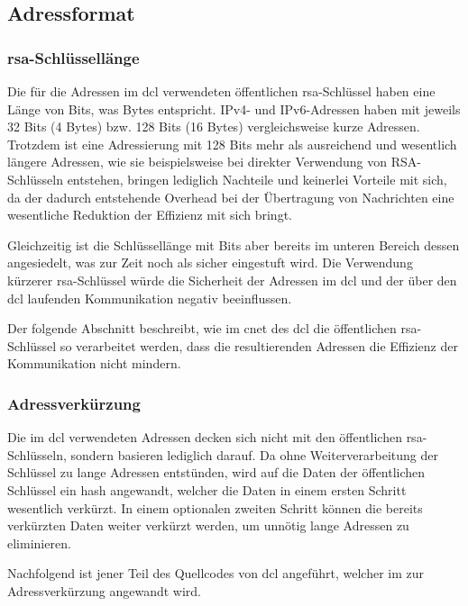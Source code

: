\subsection{Adressformat}

\subsubsection{\gls*{rsa}-Schlüssellänge}
Die für die Adressen im \gls{dcl} verwendeten öffentlichen \gls{rsa}-Schlüssel haben eine Länge von \addrkeybits
Bits, was \addrkeybytes Bytes entspricht.
IPv4- und IPv6-Adressen haben mit jeweils 32 Bits (4 Bytes) bzw. 128 Bits (16 Bytes) vergleichsweise kurze
Adressen. Trotzdem ist eine Adressierung mit 128 Bits mehr als ausreichend und wesentlich längere
Adressen, wie sie beispielsweise bei direkter Verwendung von RSA-Schlüsseln entstehen, bringen
lediglich Nachteile und keinerlei Vorteile mit sich, da der dadurch entstehende
Overhead bei der Übertragung von Nachrichten eine wesentliche Reduktion der
Effizienz mit sich bringt.

Gleichzeitig ist die Schlüssellänge mit \addrkeybits Bits aber bereits im
unteren Bereich dessen angesiedelt, was zur Zeit noch als sicher eingestuft
wird. \cite{keylength:bsi}
Die Verwendung kürzerer \gls{rsa}-Schlüssel würde die Sicherheit der Adressen
im \gls{dcl} und der über den \gls{dcl} laufenden Kommunikation negativ
beeinflussen.

Der folgende Abschnitt beschreibt, wie im \gls{cnet} des \gls{dcl} die
öffentlichen \gls{rsa}-Schlüssel so verarbeitet werden, dass die resultierenden
Adressen die Effizienz der Kommunikation nicht mindern.

\subsubsection{Adressverkürzung}
\label{dcl-addr-scaling}
Die im \gls{dcl} verwendeten Adressen decken sich nicht mit den öffentlichen \gls{rsa}-Schlüsseln,
sondern basieren lediglich darauf. Da ohne Weiterverarbeitung der Schlüssel zu lange Adressen entstünden,
wird auf die Daten der öffentlichen Schlüssel ein \gls{hash} angewandt, welcher die Daten in einem ersten
Schritt wesentlich verkürzt. In einem optionalen zweiten Schritt können die bereits verkürzten
Daten weiter verkürzt werden, um unnötig lange Adressen zu eliminieren.

Nachfolgend ist jener Teil des Quellcodes von \gls{dcl} angeführt, welcher im 
zur Adressverkürzung angewandt wird.

